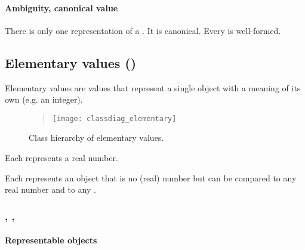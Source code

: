 \paragraph{Ambiguity, canonical value}

There is only one representation of a \DborNoneValue.
It is canonical.
Every \DborNoneValue{} is well-formed.


\subsection{Elementary values (\DborElementaryValue)}
\label{sec:elementaryvalues}
\hypertarget{sec:def:ElementaryValue}{}
\hypertarget{sec:def:NumberValue}{}
\hypertarget{sec:def:NumberlikeValue}{}
\hypertarget{sec:def:StringValue}{}

Elementary values are values that represent a single object with a meaning of its own (e.g. an integer).

\begin{figure}[H]
    \begin{quote}
        \noindent
        \texttt{[image: classdiag\_elementary]}%
        \caption{Class hierarchy of elementary values.}
        \label{fig:class:ElementaryValue}
    \end{quote}
\end{figure}

Each \DborNumberValue{} represents a real number.

Each \DborNumberlikeValue{} represents an object that is no (real) number but can be compared to any real number and
to any \DborNumberlikeValue{}.


\subsubsection{\DborMinusZeroValue, \DborInfinityValue, \DborMinusInfinityValue}
\label{sec:def:MinusZeroValue}
\label{sec:def:InfinityValue}
\label{sec:def:MinusInfinityValue}
\hypertarget{sec:def:MinusZeroValue}{}
\hypertarget{sec:def:InfinityValue}{}
\hypertarget{sec:def:MinusInfinityValue}{}

\paragraph{Representable objects}


